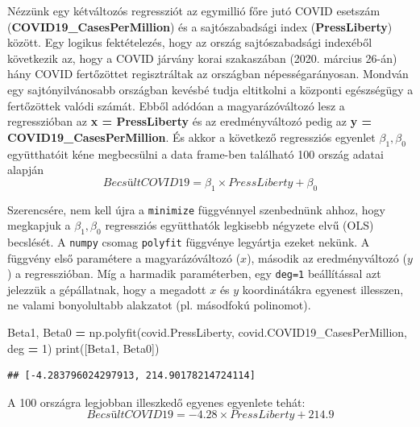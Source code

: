 \documentclass[
]{book}
\newenvironment{Shaded}{\begin{snugshade}}{\end{snugshade}}
\newcommand{\BuiltInTok}[1]{#1}
\newcommand{\DecValTok}[1]{\textcolor[rgb]{0.00,0.00,0.81}{#1}}
\newcommand{\NormalTok}[1]{#1}
\newcommand{\OperatorTok}[1]{\textcolor[rgb]{0.81,0.36,0.00}{\textbf{#1}}}
\begin{document}
Nézzünk egy kétváltozós regressziót az egymillió főre jutó COVID esetszám (\textbf{COVID19\_CasesPerMillion}) és a sajtószabadsági index (\textbf{PressLiberty}) között. Egy logikus fektételezés, hogy az ország sajtószabadsági indexéből következik az, hogy a COVID járvány korai szakaszában (2020. március 26-án) hány COVID fertőzöttet regisztráltak az országban népességarányosan. Mondván egy sajtónyilvánosabb országban kevésbé tudja eltitkolni a központi egészségügy a fertőzöttek valódi számát. Ebből adódóan a magyarázóváltozó lesz a regresszióban az \textbf{x = PressLiberty} és az eredményváltozó pedig az \textbf{y = COVID19\_CasesPerMillion}. És akkor a következő regressziós egyenlet \(\beta_1,\beta_0\) együtthatóit kéne megbecsülni a data frame-ben található 100 ország adatai alapján \[Becsült COVID19=\beta_1 \times PressLiberty+ \beta_0\]

Szerencsére, nem kell újra a \texttt{minimize} függvénnyel szenbednünk ahhoz, hogy megkapjuk a \(\beta_1,\beta_0\) regressziós együtthatók legkisebb négyzete elvű (OLS) becslését. A \texttt{numpy} csomag \texttt{polyfit} függvénye legyártja ezeket nekünk. A függvény első paramétere a magyarázóváltozó (\(x\)), második az eredményváltozó (\(y\)) a regresszióban. Míg a harmadik paraméterben, egy \texttt{deg=1} beállítással azt jelezzük a gépállatnak, hogy a megadott \(x\) és \(y\) koordinátákra egyenest illesszen, ne valami bonyolultabb alakzatot (pl. másodfokú polinomot).

\begin{Shaded}
\begin{Highlighting}[]
\NormalTok{Beta1, Beta0 }\OperatorTok{=}\NormalTok{ np.polyfit(covid.PressLiberty, covid.COVID19\_CasesPerMillion, deg }\OperatorTok{=} \DecValTok{1}\NormalTok{)}
\BuiltInTok{print}\NormalTok{([Beta1, Beta0])}
\end{Highlighting}
\end{Shaded}

\begin{verbatim}
## [-4.283796024297913, 214.90178214724114]
\end{verbatim}

A 100 országra legjobban illeszkedő egyenes egyenlete tehát: \[Becsült COVID19=-4.28 \times PressLiberty+ 214.9\]
\end{document}
